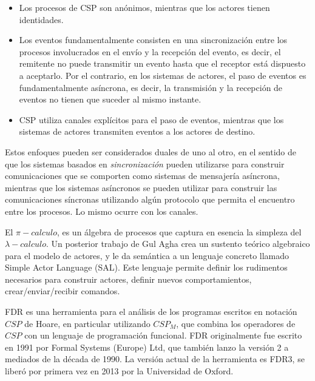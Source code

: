 \begin{itemize}
\item Los procesos de CSP son anónimos, mientras que los actores tienen identidades.
\item Los eventos fundamentalmente consisten en una sincronización entre los procesos involucrados en el envío y la recepción del evento, es decir, el remitente no puede transmitir un evento hasta que el receptor está dispuesto a aceptarlo. Por el contrario, en los sistemas de actores, el paso de eventos es fundamentalmente asíncrona, es decir, la transmisión y la recepción de eventos no tienen que suceder al mismo instante.
\item CSP utiliza canales explícitos para el paso de eventos, mientras que los sistemas de actores transmiten eventos a los actores de destino.
\end{itemize}

Estos enfoques pueden ser considerados duales de uno al otro, en el sentido de que los sistemas basados en \emph{sincronización} pueden utilizarse para construir comunicaciones que se comporten como sistemas de mensajería asíncrona, mientras que los sistemas asíncronos se pueden utilizar para construir las comunicaciones síncronas utilizando algún protocolo que permita el encuentro entre los procesos. Lo mismo ocurre con los canales.

El $\pi-calculo$, es un álgebra de procesos que captura en esencia la simpleza del $\lambda-calculo$. Un posterior trabajo de Gul Agha\cite{apicalculus} crea un sustento teórico algebraico para el modelo de actores, y le da semántica a un lenguaje concreto llamado Simple Actor Language (SAL). Este lenguaje permite definir los rudimentos necesarios para construir actores, definir nuevos comportamientos, crear/enviar/recibir comandos.

FDR es una herramienta para el análisis de los programas escritos en notación $CSP$ de Hoare, en particular utilizando $CSP_M$, que combina los operadores de $CSP$ con un lenguaje de programación funcional. FDR originalmente fue escrito en 1991 por Formal Systems (Europe) Ltd, que también lanzo la versión 2 a mediados de la década de 1990. La versión actual de la herramienta es FDR3, se liberó por primera vez en 2013 por la Universidad de Oxford.
